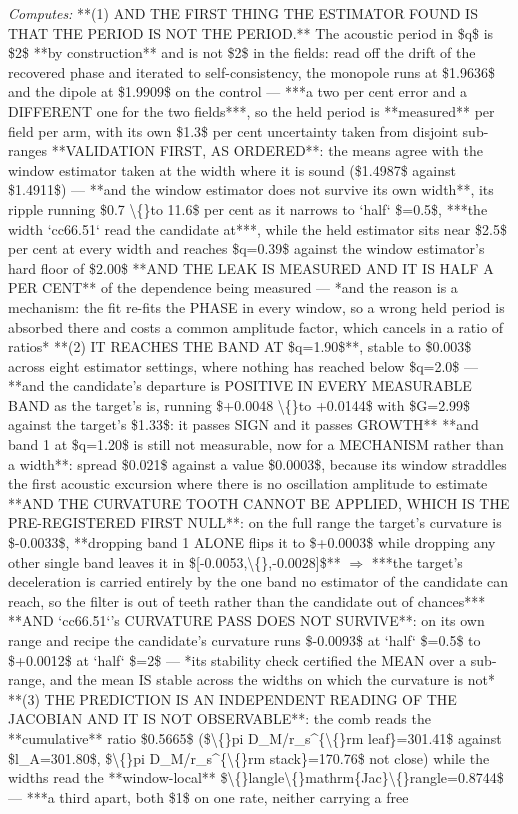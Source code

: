 \begin{description}
\emph{Computes:}  **(1) AND THE FIRST THING THE ESTIMATOR FOUND IS THAT THE PERIOD IS NOT THE PERIOD.** The acoustic period in \$q\$ is \$2\$ **by construction** and is not \$2\$ in the fields: read off the drift of the recovered phase and iterated to self-consistency, the monopole runs at \$1.9636\$ and the dipole at \$1.9909\$ on the control --- ***a two per cent error and a DIFFERENT one for the two fields***, so the held period is **measured** per field per arm, with its own \$1.3\$ per cent uncertainty taken from disjoint sub-ranges   **VALIDATION FIRST, AS ORDERED**: the means agree with the window estimator taken at the width where it is sound (\$1.4987\$ against \$1.4911\$) ---  **and the window estimator does not survive its own width**, its ripple running \$0.7 \textbackslash\{\}to 11.6\$ per cent as it narrows to `half` \$=0.5\$, ***the width `cc66.51` read the candidate at***, while the held estimator sits near \$2.5\$ per cent at every width and reaches \$q=0.39\$ against the window estimator's hard floor of \$2.00\$   **AND THE LEAK IS MEASURED AND IT IS HALF A PER CENT** of the dependence being measured --- *and the reason is a mechanism: the fit re-fits the PHASE in every window, so a wrong held period is absorbed there and costs a common amplitude factor, which cancels in a ratio of ratios*   **(2) IT REACHES THE BAND AT \$q=1.90\$**, stable to \$0.003\$ across eight estimator settings, where nothing has reached below \$q=2.0\$ --- **and the candidate's departure is POSITIVE IN EVERY MEASURABLE BAND as the target's is, running \$+0.0048 \textbackslash\{\}to +0.0144\$ with \$G=2.99\$ against the target's \$1.33\$: it passes SIGN and it passes GROWTH**   **and band 1 at \$q=1.20\$ is still not measurable, now for a MECHANISM rather than a width**: spread \$0.021\$ against a value \$0.0003\$, because its window straddles the first acoustic excursion where there is no oscillation amplitude to estimate   **AND THE CURVATURE TOOTH CANNOT BE APPLIED, WHICH IS THE PRE-REGISTERED FIRST NULL**: on the full range the target's curvature is \$-0.0033\$, **dropping band 1 ALONE flips it to \$+0.0003\$ while dropping any other single band leaves it in \$[-0.0053,\textbackslash\{\},-0.0028]\$** \ensuremath{\Rightarrow} ***the target's deceleration is carried entirely by the one band no estimator of the candidate can reach, so the filter is out of teeth rather than the candidate out of chances***   **AND `cc66.51`'s CURVATURE PASS DOES NOT SURVIVE**: on its own range and recipe the candidate's curvature runs \$-0.0093\$ at `half` \$=0.5\$ to \$+0.0012\$ at `half` \$=2\$ --- *its stability check certified the MEAN over a sub-range, and the mean IS stable across the widths on which the curvature is not*   **(3) THE PREDICTION IS AN INDEPENDENT READING OF THE JACOBIAN AND IT IS NOT OBSERVABLE**: the comb reads the **cumulative** ratio \$0.5665\$ (\$\textbackslash\{\}pi D\_M/r\_s\textasciicircum{}\{\textbackslash\{\}rm leaf\}=301.41\$ against \$l\_A=301.80\$, \$\textbackslash\{\}pi D\_M/r\_s\textasciicircum{}\{\textbackslash\{\}rm stack\}=170.76\$ not close) while the widths read the **window-local** \$\textbackslash\{\}langle\textbackslash\{\}mathrm\{Jac\}\textbackslash\{\}rangle=0.8744\$ --- ***a third apart, both \$1\$ on one rate, neither carrying a free 
\end{description}
